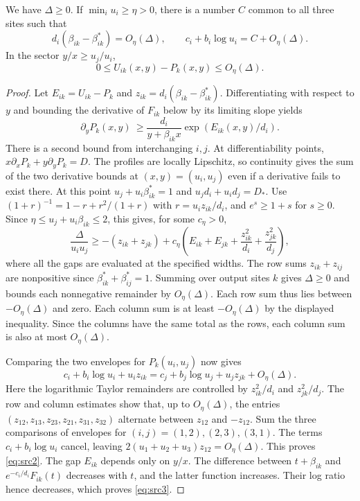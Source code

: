 \begin{proposition}\label{thm:profile-rigidity}
We have $\Delta\ge0$. If $\min_i u_i\ge\eta>0$, there is a number $C$
common to all three sites such that
\begin{equation}\label{eq:src2}
 d_i(\beta_{ik}-\beta_{ik}^*)=O_\eta(\Delta),\qquad
 c_i+b_i\log u_i=C+O_\eta(\Delta).
\end{equation}
In the sector $y/x\ge u_j/u_i$,
\begin{equation}\label{eq:src3}
 0\le U_{ik}(x,y)-P_k(x,y)\le O_\eta(\Delta).
\end{equation}
\end{proposition}

\begin{proof}
Let $E_{ik}=U_{ik}-P_k$ and $z_{ik}=d_i(\beta_{ik}-\beta^*_{ik})$.
Differentiating with respect to $y$ and bounding the derivative of
$F_{ik}$ below by its limiting slope yields
\[
 \partial_y P_k(x,y)\ \ge \frac{d_i}{y+\beta_{ik}x}\exp(E_{ik}(x,y)/d_i).
\]
There is a second bound from interchanging $i,j$. At differentiability
points, $x\partial_xP_k+y\partial_yP_k=D$. The profiles are locally
Lipschitz, so continuity gives the sum of the two derivative bounds at
$(x,y)=(u_i,u_j)$ even if a derivative fails to exist there.
At this point $u_j+u_i\beta^*_{ik}=1$ and $u_jd_i+u_id_j=D_*$.
Use $(1+r)^{-1}=1-r+r^2/(1+r)$ with
$r=u_i z_{ik}/d_i$, and $e^s\ge1+s$ for $s\ge0$.
Since $\eta\le u_j+u_i\beta_{ik}\le2$, this gives, for some $c_\eta>0$,
\[
 \frac{\Delta}{u_iu_j}\ge -(z_{ik}+z_{jk})+
 c_\eta\left(E_{ik}+E_{jk}
           +\frac{z_{ik}^2}{d_i}+\frac{z_{jk}^2}{d_j}\right),
\]
where all the gaps are evaluated at the specified widths.
The row sums $z_{ik}+z_{ij}$ are nonpositive since
$\beta^*_{ik}+\beta^*_{ij}=1$. Summing over output sites $k$ gives
$\Delta\ge0$ and bounds each nonnegative remainder by $O_\eta(\Delta)$.
Each row sum thus lies between $-O_\eta(\Delta)$ and zero. Each
column sum is at least $-O_\eta(\Delta)$ by the displayed inequality.
Since the columns have the same total as the rows, each column sum is
also at most $O_\eta(\Delta)$.

Comparing the two envelopes for $P_k(u_i,u_j)$ now gives
\[
 c_i+b_i\log u_i+u_i z_{ik}
 =c_j+b_j\log u_j+u_j z_{jk}+O_\eta(\Delta).
\]
Here the logarithmic Taylor remainders are controlled by
$z_{ik}^2/d_i$ and $z_{jk}^2/d_j$. The row and column estimates
show that, up to $O_\eta(\Delta)$, the entries
$(z_{12},z_{13},z_{23},z_{21},z_{31},z_{32})$ alternate between
$z_{12}$ and $-z_{12}$. Sum the three comparisons of envelopes for
$(i,j)=(1,2),(2,3),(3,1)$. The terms $c_i+b_i\log u_i$ cancel, leaving
$2(u_1+u_2+u_3)z_{12}=O_\eta(\Delta)$.
This proves \eqref{eq:src2}. The gap $E_{ik}$ depends only on $y/x$. The
difference between $t+\beta_{ik}$ and $e^{-c_i/d_i}F_{ik}(t)$ decreases
with $t$, and the latter function increases. Their log ratio hence
decreases, which proves \eqref{eq:src3}.
\end{proof}

